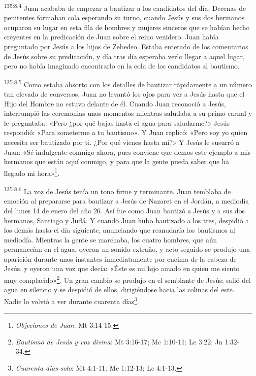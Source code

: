 \par 
\textsuperscript{135:8.4} Juan acababa de empezar a bautizar a los candidatos del día. Decenas de penitentes formaban cola esperando su turno, cuando Jesús y sus dos hermanos ocuparon su lugar en esta fila de hombres y mujeres sinceros que se habían hecho creyentes en la predicación de Juan sobre el reino venidero. Juan había preguntado por Jesús a los hijos de Zebedeo. Estaba enterado de los comentarios de Jesús sobre su predicación, y día tras día esperaba verlo llegar a aquel lugar, pero no había imaginado encontrarlo en la cola de los candidatos al bautismo.

\par 
\textsuperscript{135:8.5} Como estaba absorto con los detalles de bautizar rápidamente a un número tan elevado de conversos, Juan no levantó los ojos para ver a Jesús hasta que el Hijo del Hombre no estuvo delante de él. Cuando Juan reconoció a Jesús, interrumpió las ceremonias unos momentos mientras saludaba a su primo carnal y le preguntaba: «Pero ¿por qué bajas hasta el agua para saludarme?» Jesús respondió: «Para someterme a tu bautismo». Y Juan replicó: «Pero soy yo quien necesita ser bautizado por ti. ¿Por qué vienes hasta mí?» Y Jesús le susurró a Juan: «Sé indulgente conmigo ahora, pues conviene que demos este ejemplo a mis hermanos que están aquí conmigo, y para que la gente pueda saber que ha llegado mi hora»\footnote{\textit{Objeciones de Juan}: Mt 3:14-15.}.

\par 
\textsuperscript{135:8.6} La voz de Jesús tenía un tono firme y terminante. Juan temblaba de emoción al prepararse para bautizar a Jesús de Nazaret en el Jordán, a mediodía del lunes 14 de enero del año 26. Así fue como Juan bautizó a Jesús y a sus dos hermanos, Santiago y Judá. Y cuando Juan hubo bautizado a los tres, despidió a los demás hasta el día siguiente, anunciando que reanudaría los bautismos al mediodía. Mientras la gente se marchaba, los cuatro hombres, que aún permanecían en el agua, oyeron un sonido extraño, y acto seguido se produjo una aparición durante unos instantes inmediatamente por encima de la cabeza de Jesús, y oyeron una voz que decía: «Éste es mi hijo amado en quien me siento muy complacido»\footnote{\textit{Bautismo de Jesús y voz divina}: Mt 3:16-17; Mc 1:10-11; Lc 3:22; Jn 1:32-34.}. Un gran cambio se produjo en el semblante de Jesús; salió del agua en silencio y se despidió de ellos, dirigiéndose hacia las colinas del este. Nadie lo volvió a ver durante cuarenta días\footnote{\textit{Cuarenta días solo}: Mt 4:1-11; Mc 1:12-13; Lc 4:1-13.}.


